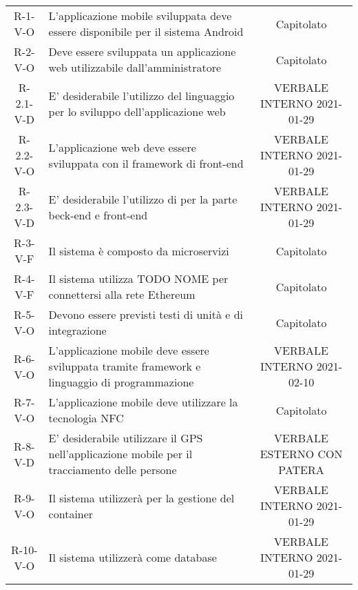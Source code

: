 \begin{longtable}{ c C{9cm} c }
    R-1-V-O     & L'applicazione mobile sviluppata deve essere disponibile per il sistema Android & Capitolato\\
    R-2-V-O     & Deve essere sviluppata un applicazione web utilizzabile dall'amministratore & Capitolato\\
    R-2.1-V-D   & E' desiderabile l'utilizzo del linguaggio  per lo sviluppo dell'applicazione web & VERBALE INTERNO 2021-01-29 \\
    R-2.2-V-O   & L'applicazione web deve essere sviluppata con il framework di front-end  & VERBALE INTERNO 2021-01-29 \\
    R-2.3-V-D   & E' desiderabile l'utilizzo di  per la parte beck-end e front-end &  VERBALE INTERNO 2021-01-29 \\
    R-3-V-F     & Il sistema è composto da microservizi & Capitolato\\
    R-4-V-F     & Il sistema utilizza TODO NOME per connettersi alla rete Ethereum & Capitolato\\
    R-5-V-O     & Devono essere previsti testi di unità e di integrazione & Capitolato\\
    R-6-V-O     & L'applicazione mobile deve essere sviluppata tramite framework  e linguaggio di programmazione  & VERBALE INTERNO 2021-02-10 \\
    R-7-V-O     & L'applicazione mobile deve utilizzare la tecnologia NFC & Capitolato \\
    R-8-V-D     & E' desiderabile utilizzare il GPS nell'applicazione mobile per il tracciamento delle persone & VERBALE ESTERNO CON PATERA \\
    R-9-V-O     & Il sistema utilizzerà  per la gestione del container & VERBALE INTERNO 2021-01-29 \\
    R-10-V-O    & Il sistema utilizzerà  come database & VERBALE INTERNO 2021-01-29 \\



\end{longtable}